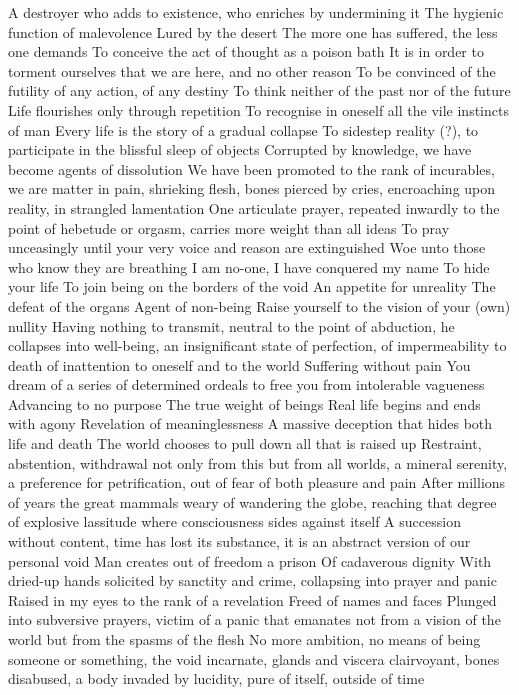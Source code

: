 \documentclass{article}
\begin{document}
A destroyer who adds to existence, who enriches by undermining it
The hygienic function of malevolence
Lured by the desert
The more one has suffered, the less one demands
To conceive the act of thought as a poison bath
It is in order to torment ourselves that we are here, and no other reason
To be convinced of the futility of any action, of any destiny
To think neither of the past nor of the future
Life flourishes only through repetition
To recognise in oneself all the vile instincts of man
Every life is the story of a gradual collapse
To sidestep reality (?), to participate in the blissful sleep of objects
Corrupted by knowledge, we have become agents of dissolution
We have been promoted to the rank of incurables, we are matter in pain, shrieking flesh, bones pierced by cries, encroaching upon reality, in strangled lamentation
One articulate prayer, repeated inwardly to the point of hebetude or orgasm, carries more weight than all ideas
To pray unceasingly until your very voice and reason are extinguished
Woe unto those who know they are breathing
I am no-one, I have conquered my name
To hide your life
To join being on the borders of the void
An appetite for unreality
The defeat of the organs
Agent of non-being
Raise yourself to the vision of your (own) nullity
Having nothing to transmit, neutral to the point of abduction, he collapses into well-being, an insignificant state of perfection, of impermeability to death of inattention to oneself and to the world
Suffering without pain
You dream of a series of determined ordeals to free you from intolerable vagueness
Advancing to no purpose
The true weight of beings
Real life begins and ends with agony
Revelation of meaninglessness
A massive deception that hides both life and death
The world chooses to pull down all that is raised up
Restraint, abstention, withdrawal not only from this but from all worlds, a mineral serenity, a preference for petrification, out of fear of both pleasure and pain
After millions of years the great mammals weary of wandering the globe, reaching that degree of explosive lassitude where consciousness sides against itself
A succession without content, time has lost its substance, it is an abstract version of our personal void
Man creates out of freedom a prison
Of cadaverous dignity
With dried-up hands solicited by sanctity and crime, collapsing into prayer and panic
Raised in my eyes to the rank of a revelation
Freed of names and faces
Plunged into subversive prayers, victim of a panic that emanates not from a vision of the world but from the spasms of the flesh
No more ambition, no means of being someone or something, the void incarnate, glands and viscera clairvoyant, bones disabused, a body invaded by lucidity, pure of itself, outside of time
\end{document}
